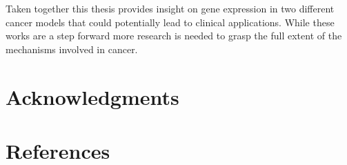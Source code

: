 \documentclass[
  12pt,
  openany]{book}
\begin{document}
Taken together this thesis provides insight on gene expression in two different cancer models that could potentially lead to clinical applications. While these works are a step forward more research is needed to grasp the full extent of the mechanisms involved in cancer.

\hypertarget{acknowledgments}{%
\chapter*{Acknowledgments}\label{acknowledgments}}

\hypertarget{references}{%
\chapter*{References}\label{references}}
\end{document}
